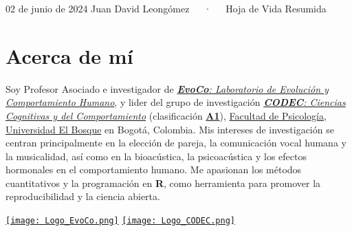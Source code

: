 \documentclass[11pt,a4paper,]{awesome-cv}
\begin{document}
\makecvheader

\makecvfooter
  {02 de junio de 2024}
    {Juan David Leongómez~~~·~~~Hoja de Vida Resumida}
  {\thepage}





\section{Acerca de mí}\label{acerca-de-muxed}

\begin{minipage}[c]{0.9\linewidth}
Soy Profesor Asociado e investigador de \href{https://jdleongomez.info/es/team/}{\textit{\textbf{EvoCo}: Laboratorio de Evolución y Comportamiento Humano}}, y lider del grupo de investigación \href{https://investigaciones.unbosque.edu.co/codec}{\textit{\textbf{CODEC}: Ciencias Cognitivas y del Comportamiento}} (clasificación  \href{https://scienti.minciencias.gov.co/gruplac/jsp/visualiza/visualizagr.jsp?nro=00000000001446}{\textbf{A1}}),  \href{https://www.uelbosque.edu.co/psicologia}{Facultad de Psicología}, \href{https://www.uelbosque.edu.co/}{Universidad El Bosque} en Bogotá, Colombia. Mis intereses de investigación se centran principalmente en la elección de pareja, la comunicación vocal humana y la musicalidad, así como en la bioacústica, la psicoacústica y los efectos hormonales en el comportamiento humano. Me apasionan los métodos cuantitativos y la programación en \textbf{R}, como herramienta para promover la reproducibilidad y la ciencia abierta.
\end{minipage} \begin{minipage}[c]{0.1\linewidth}
\begin{flushright} 
\hfill \href{https://jdleongomez.info/es/team/}{\texttt{[image: Logo\_EvoCo.png]}} \newline \href{https://investigaciones.unbosque.edu.co/codec}{\texttt{[image: Logo\_CODEC.png]}}
\end{flushright}
\end{minipage}
\end{document}

